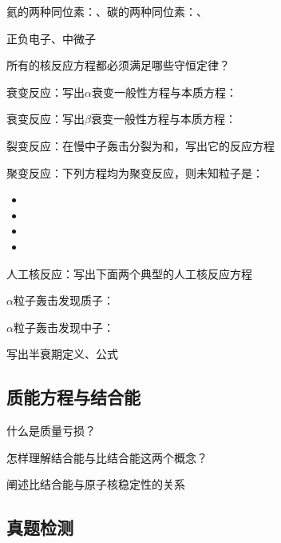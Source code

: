 氦的两种同位素：\lunl{3em}、\lunl{3em}\quad 碳的两种同位素：\lunl{3em}、\lunl{3em}

正负电子\lunl{3em}、\lunl{3em}\quad 中微子\lunl{3em}

所有的核反应方程都必须满足哪些守恒定律？
\vspace*{1.5cm}

衰变反应：写出\(\alpha\)衰变一般性方程与本质方程：
\vspace*{1.5cm}

\newpage
{}衰变反应：写出\(\beta\)衰变一般性方程与本质方程：
\vspace*{1.5cm}

裂变反应：在慢中子轰击分裂为和，写出它的反应方程
\vspace*{1.5cm}

聚变反应：下列方程均为聚变反应，则未知粒子是：
\begin{itemize}
    \item {}\qquad \lunl{4em}
    \item {}\qquad \lunl{4em}
    \item {}\qquad \lunl{4em}
    \item {}\qquad \lunl{4em}
\end{itemize}

人工核反应：写出下面两个典型的人工核反应方程

\(\alpha\)粒子轰击发现质子：\lunl{20em}

\(\alpha\)粒子轰击发现中子：\lunl{20em}


写出半衰期定义、公式
\vspace*{2cm}
\subsection{质能方程与结合能}
什么是质量亏损？
\vspace*{2cm}

怎样理解结合能与比结合能这两个概念？
\vspace*{4cm}

阐述比结合能与原子核稳定性的关系
\newpage
\subsection{真题检测}




